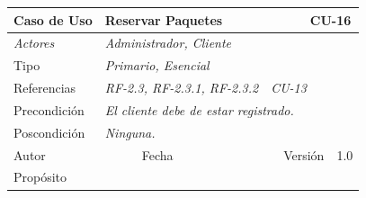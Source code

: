 \begin{table}[H]
    \begin{tabular}{|llllllll|}
    \hline
    \multicolumn{1}{|l|}{\cellcolor[HTML]{F2F2F2}Caso de Uso}           & \multicolumn{5}{l|}{Reservar Paquetes}                                                                       & \multicolumn{2}{l|}{\cellcolor[HTML]{E6E6E6}CU-16}             \\ \hline
    \multicolumn{1}{|l|}{{\color[HTML]{808080} \textit{Actores}}}       & \multicolumn{7}{l|}{{\color[HTML]{808080} \textit{Administrador, Cliente}}}                                                                                                      \\ \hline
    \multicolumn{1}{|l|}{Tipo}                                          & \multicolumn{7}{l|}{{\color[HTML]{808080} \textit{Primario, Esencial}}}                                                                                                                           \\ \hline
    \multicolumn{1}{|l|}{Referencias}                                   & \multicolumn{3}{l|}{{\color[HTML]{808080} \textit{RF-2.3, RF-2.3.1, RF-2.3.2}}}                & \multicolumn{3}{l|}{{\color[HTML]{808080} \textit{CU-13}}} &                                                                  \\ \hline
    \multicolumn{1}{|l|}{Precondici\'on}                                  & \multicolumn{7}{l|}{{\color[HTML]{808080} \textit{El cliente debe de estar registrado.}}}                                                                                                      \\ \hline
    \multicolumn{1}{|l|}{Poscondici\'on}                                  & \multicolumn{7}{l|}{{\color[HTML]{808080} \textit{Ninguna.}}}                                                                                                                                                                             \\ \hline
    \multicolumn{1}{|l|}{Autor}                                         & \multicolumn{1}{l|}{}                         & \multicolumn{2}{l|}{Fecha}             & \multicolumn{1}{l|}{}        & \multicolumn{2}{l|}{Versi\'on}             & 1.0                            \\ \hline
    \multicolumn{8}{|l|}{Prop\'osito}                                                                                                                                                                                                                                         \\ \hline

\end{tabular}
\end{table}

